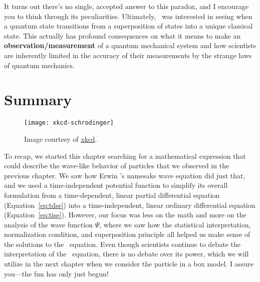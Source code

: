 It turns out there's no single, accepted answer to this paradox, and I encourage you to think through its peculiarities. Ultimately, \Sch\ was interested in seeing when a quantum state transitions from a superposition of states into a unique classical state. This actually has profound consequences on what it means to make an \textbf{observation/measurement} of a quantum mechanical system and how scientists are inherently limited in the accuracy of their measurements by the strange laws of quantum mechanics.


\section{Summary}
\begin{figure}[!h]
	\centering
	\texttt{[image: xkcd-schrodinger]}
	\caption{Image courtesy of \href{https://xkcd.com/45/}{xkcd}.}
	\label{fig:xkcd2}
\end{figure}

To recap, we started this chapter searching for a mathematical expression that could describe the wave-like behavior of particles that we observed in the previous chapter. We saw how Erwin \Sch's namesake wave equation did just that, and we used a time-independent potential function to simplify its overall formulation from a time-dependent, linear partial differential equation (Equation~\ref{eq:tdse}) into a time-independent, linear ordinary differential equation (Equation~\ref{eq:tise}). However, our focus was less on the math and more on the analysis of the wave function $\Psi$, where we saw how the statistical interpretation, normalization condition, and superposition principle all helped us make sense of the solutions to the \Sch\ equation. Even though scientists continue to debate the interpretation of the \Sch\ equation, there is no debate over its power, which we will utilize in the next chapter when we consider the particle in a box model. I assure you---the fun has only just begun!


%